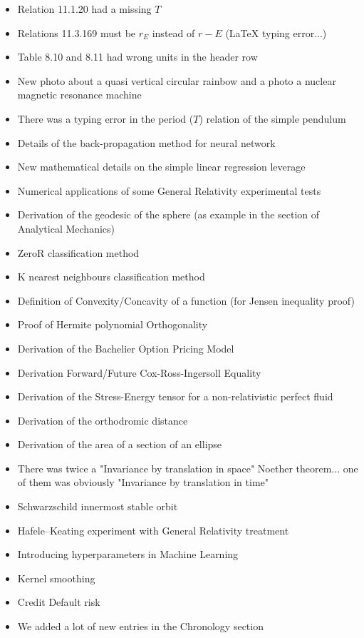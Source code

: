 \begin{itemize}
\begin{itemize}[noitemsep]
			\item Relation 11.1.20 had a missing $T$
			\item Relations 11.3.169 must be $r_E$ instead of $r-E$ (LaTeX typing error...)
			\item Table 8.10 and 8.11 had wrong units in the header row
			\item New photo about a quasi vertical circular rainbow and a photo a nuclear magnetic resonance machine
			\item There was a typing error in the period ($T$) relation of the simple pendulum
			\item Details of the back-propagation method for neural network
			\item New mathematical details on the simple linear regression leverage
			\item Numerical applications of some General Relativity experimental tests
			\item Derivation of the geodesic of the sphere (as example in the section of Analytical Mechanics)
			\item ZeroR classification method
			\item K nearest neighbours classification method
			\item Definition of Convexity/Concavity of a function (for Jensen inequality proof)
			\item Proof of  Hermite polynomial Orthogonality
			\item Derivation of the Bachelier Option Pricing Model
			\item Derivation Forward/Future Cox-Ross-Ingersoll Equality
			\item Derivation of the Stress-Energy tensor for a non-relativistic perfect fluid
			\item Derivation of the orthodromic distance
			\item Derivation of the area of a section of an ellipse
			\item There was twice a "Invariance by translation in space" Noether theorem... one of them was obviously "Invariance by translation in time"
			\item Schwarzschild innermost stable orbit
			\item Hafele–Keating experiment with General Relativity treatment
			\item Introducing hyperparameters in Machine Learning
			\item Kernel smoothing
			\item Credit Default risk
			\item We added a lot of new entries in the Chronology section

\end{itemize}
\end{itemize}
